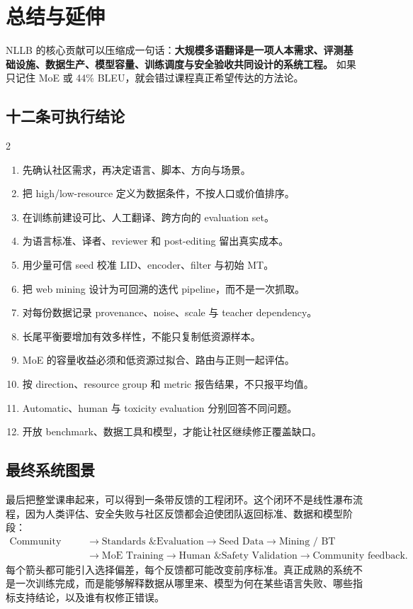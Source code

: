 \section{总结与延伸}

NLLB 的核心贡献可以压缩成一句话：\textbf{大规模多语翻译是一项人本需求、评测基础设施、数据生产、模型容量、训练调度与安全验收共同设计的系统工程。} 如果只记住 MoE 或 44\% BLEU，就会错过课程真正希望传达的方法论。

\subsection{十二条可执行结论}

\begingroup
\footnotesize
\setlength{\columnsep}{1.2em}
\begin{multicols}{2}
\begin{enumerate}[itemsep=0.08em,topsep=0.15em,parsep=0pt,leftmargin=*]
  \item 先确认社区需求，再决定语言、脚本、方向与场景。
  \item 把 high/low-resource 定义为数据条件，不按人口或价值排序。
  \item 在训练前建设可比、人工翻译、跨方向的 evaluation set。
  \item 为语言标准、译者、reviewer 和 post-editing 留出真实成本。
  \item 用少量可信 seed 校准 LID、encoder、filter 与初始 MT。
  \item 把 web mining 设计为可回溯的迭代 pipeline，而不是一次抓取。
  \item 对每份数据记录 provenance、noise、scale 与 teacher dependency。
  \item 长尾平衡要增加有效多样性，不能只复制低资源样本。
  \item MoE 的容量收益必须和低资源过拟合、路由与正则一起评估。
  \item 按 direction、resource group 和 metric 报告结果，不只报平均值。
  \item Automatic、human 与 toxicity evaluation 分别回答不同问题。
  \item 开放 benchmark、数据工具和模型，才能让社区继续修正覆盖缺口。
\end{enumerate}
\end{multicols}
\endgroup

\subsection{最终系统图景}

最后把整堂课串起来，可以得到一条带反馈的工程闭环。这个闭环不是线性瀑布流程，因为人类评估、安全失败与社区反馈都会迫使团队返回标准、数据和模型阶段：
\[
\begin{aligned}
\text{Community needs}
&\rightarrow\text{Standards \& Evaluation}
\rightarrow\text{Seed Data}
\rightarrow\text{Mining / BT}\\
&\rightarrow\text{MoE Training}
\rightarrow\text{Human \& Safety Validation}
\rightarrow\text{Community feedback}.
\end{aligned}
\]
每个箭头都可能引入选择偏差，每个反馈都可能改变前序标准。真正成熟的系统不是一次训练完成，而是能够解释数据从哪里来、模型为何在某些语言失败、哪些指标支持结论，以及谁有权修正错误。

